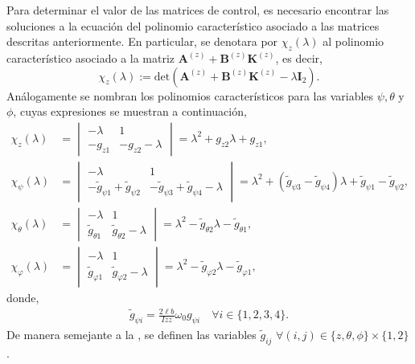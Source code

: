 Para determinar el valor de las matrices de control, es necesario encontrar las soluciones a la ecuación del polinomio característico asociado a las matrices descritas anteriormente. En particular, se denotara por $\chi_{z}(\lambda)$ al polinomio característico asociado a la matriz $\mathbf{A}^{(z)}+\mathbf{B}^{(z)}\mathbf{K}^{(z)}$, es decir, 
$$\chi_z(\lambda) := \text{det}(\mathbf{A}^{(z)}+\mathbf{B}^{(z)}\mathbf{K}^{(z)} - \lambda \mathbf{I}_2).$$
Análogamente se nombran los polinomios característicos para las variables $\psi, \theta$ y $\phi$, cuyas expresiones se muestran a continuación,  
\begin{align}
\chi_z(\lambda) &= 
\begin{vmatrix}
    -\lambda & 1 \\
    -g_{z 1} & -g_{z 2} -\lambda
\end{vmatrix}
= \lambda^{2} + g_{z 2}\lambda + g_{z 1}, \\
\chi_{\psi}(\lambda) &= 
\begin{vmatrix}
    -\lambda & 1 \\
    -\tilde{g}_{\psi 1} + \tilde{g}_{\psi 2} & 
    -\tilde{g}_{\psi 3} + \tilde{g}_{\psi 4} -\lambda
\end{vmatrix}
= \lambda^{2} + (\tilde{g}_{\psi 3} -\tilde{g}_{\psi 4})\lambda+ \tilde{g}_{\psi 1} -\tilde{g}_{\psi 2},\\
\chi_{\theta}(\lambda) &= 
\begin{vmatrix}
    -\lambda & 1 \\
    \tilde{g}_{\theta 1} & \tilde{g}_{\theta 2} -\lambda
\end{vmatrix} = 
\lambda^2 -\tilde{g}_{\theta 2}\lambda - \tilde{g}_{\theta 1}, \\
\chi_{\varphi}(\lambda) &= 
\begin{vmatrix}
    -\lambda & 1 \\
    \tilde{g}_{\varphi 1} & \tilde{g}_{\varphi 2} -\lambda
\end{vmatrix} = \lambda^2 - \tilde{g}_{\varphi 2}\lambda - \tilde{g}_{\varphi 1},
\end{align}
donde, 
\begin{align} \label{eq:g_tilde}
    \tilde{g}_{\psi i} = \frac{2\ell b}{Izz}\omega_0 g_{\psi i} \quad \forall i \in \{1, 2, 3, 4\}.
\end{align}
De manera semejante a la , se definen las variables $\tilde{g}_{ij}$  $\forall (i, j) \in \{z, \theta, \phi\}\times\{1, 2\}$. 

